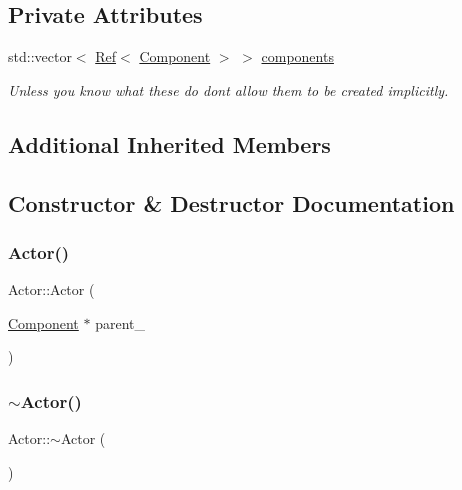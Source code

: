\subsection*{Private Attributes}
\begin{DoxyCompactItemize}
\item 
std\+::vector$<$ \hyperlink{BStateMachine_2Component_8h_add5e90b302c31b74a46619f240214bcc}{Ref}$<$ \hyperlink{classComponent}{Component} $>$ $>$ \hyperlink{classActor_a1ec17d9a692715e0afbd28309315da03}{components}
\begin{DoxyCompactList}\small\item\em Unless you know what these do don\textquotesingle{}t allow them to be created implicitly. \end{DoxyCompactList}\end{DoxyCompactItemize}
\subsection*{Additional Inherited Members}


\subsection{Constructor \& Destructor Documentation}
\mbox{\label{classActor_a7b296cba96bef9d1cc5893114078f1da}} 
\subsubsection{\texorpdfstring{Actor()}{Actor()}}
{\footnotesize\ttfamily Actor\+::\+Actor (\begin{DoxyParamCaption}\item[{\hyperlink{classComponent}{Component} $\ast$}]{parent\+\_\+ }\end{DoxyParamCaption})}

\mbox{\label{classActor_ad807fe8f85e72ab263a0c05e3231cb39}} 
\subsubsection{\texorpdfstring{$\sim$\+Actor()}{~Actor()}}
{\footnotesize\ttfamily Actor\+::$\sim$\+Actor (\begin{DoxyParamCaption}{ }\end{DoxyParamCaption})}



